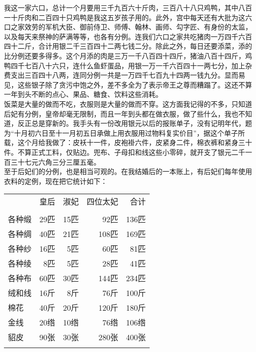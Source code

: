 我这一家六口，总计一个月要用三千九百六十斤肉，三百八十八只鸡鸭，其中八百一十斤肉和二百四十只鸡鸭是我这五岁孩子用的。此外，宫中每天还有大批为这六口之家效劳的军机大臣、御前侍卫、师傅、翰林、画师、勾字匠、有身份的太监，以及每天来祭神的萨满等等，也各有分例。连我们六口之家共吃猪肉一万四千六百四十二斤，合计用银二千三百四十二两七钱二分。除此之外，每日还要添菜，添的比分例还要多得多。这个月添的肉是三万一千八百四十四斤，猪油八百十四斤，鸡鸭四千七百八十六只，连什么鱼虾蛋品，用银一万一千六百四十一两七分，加上杂费支出三百四十八两，连同分例一共是一万四千七百九十四两一钱九分。显而易见，这些银子除了贪污中饱之外，差不多全为了表示帝王之尊而糟蹋了。这还不算一年到头不断的点心、果品、糖食、饮料这些消耗。\\

饭菜是大量的做而不吃，衣服则是大量的做而不穿。这方面我记得的不多，只知道后妃有分例，皇帝却毫无限制，而且一年到头都在做衣服，做了些什么，我也不知道，反正总是穿新的。我手头有一份改用银元以后的报账单子，没有记明年代，题为“十月初六日至十一月初五日承做上用衣服用过物料复实价目”，据这个单子所载，这个月给我做了：皮袄十一件，皮袍褂六件，皮紧身二件，棉衣裤和紧身三十件。不算正式工料，仅贴边。兜布、子母扣和线这些小零碎，就开支了银元二千一百三十七元六角三分三厘五毫。\\

至于后妃们的分例，也是相当可观的。在我结婚后的一本账上，有后妃们每年使用衣料的定例，现在把它统计如下：\\

\begin{center}
	\begin{tabular}{ l r r rr}
		&  皇后 & 淑妃 &  四位太妃&  合计\\
		&&&&\\
		各种缎 &29匹&    15匹&      92匹&    136匹\\
		各种绸 &40匹&    21匹&     108匹&    169匹\\
		各种纱 &16匹&    5匹&      60匹&     81匹\\
		各种绫 &8匹&    5匹&      28匹&     41匹\\
		各种布 &60匹&    30匹&     144匹&    234匹\\
		绒和线 & 16斤&     8斤&      76斤&    100斤\\
		棉花    & 40斤&    20斤&     120斤&    180斤\\
		金线    &   20绺&    10绺&      76绺&    106绺\\
		貂皮    &     90张&    30张&     280张&    400张\\
		&&&&\\
	\end{tabular}
\end{center}

